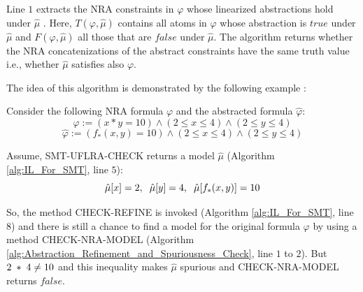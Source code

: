 \noindent Line $1$ extracts the NRA constraints in $\varphi$ whose linearized abstractions hold under $\hat{\mu}$ \cite{Cimatti:2018:ILS:3274693.3230639}.
Here, $T(\varphi, \hat{\mu})$ contains all atoms in $\varphi$ whose abstraction is $true$ under $\hat{\mu}$ and $F(\varphi, \hat{\mu})$ all those that are $false$ under $\hat{\mu}$.
The algorithm returns whether the NRA concatenizations of the abstract constraints have the same truth value i.e., whether $\hat{\mu}$
 satisfies also $\varphi$.\newline

\noindent The idea of this algorithm is demonstrated by the following example \cite{Cimatti:2018:ILS:3274693.3230639}:\newline

\begin{example}
Consider the following NRA formula $\varphi$ and the abstracted formula $\hat{\varphi}$:
$$\varphi := (x \ast y = 10) \wedge (2 \leq x \leq 4) \wedge (2 \leq y \leq 4)$$
$$\hat{\varphi} := (f_{\ast}(x, y) = 10) \wedge (2 \leq x \leq 4) \wedge (2 \leq y \leq 4)$$

Assume, SMT-UFLRA-CHECK returns a model $\hat{\mu}$ (Algorithm \ref{alg:IL_For_SMT}, line $5$):
$$\hat{\mu}[x] = 2, \hspace{2mm}\hat{\mu}[y] = 4, \hspace{2mm}\hat{\mu}[f_\ast(x, y)] = 10$$
\end{example}

\noindent So, the method CHECK-REFINE is invoked (Algorithm \ref{alg:IL_For_SMT}, line $8$) and there is still a chance to find a model for the original formula $\varphi$ by using a method CHECK-NRA-MODEL (Algorithm \ref{alg:Abstraction_Refinement_and_Spuriousness_Check}, line $1$ to $2$).
But $2 \hspace{1mm} \ast \hspace{1mm} 4 \neq 10$ and this inequality makes $\hat{\mu}$ spurious and CHECK-NRA-MODEL returns $false$.
